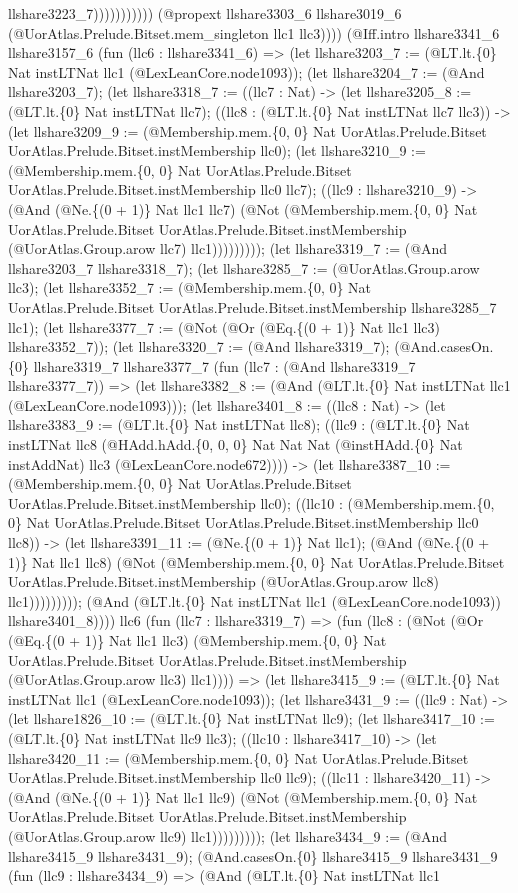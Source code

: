 \documentclass[11pt]{article}
\begin{document}
llshare3223\_7))))))))))) (@propext llshare3303\_6 llshare3019\_6 (@UorAtlas.Prelude.Bitset.mem\_singleton llc1 llc3)))) (@Iff.intro llshare3341\_6 llshare3157\_6 (fun (llc6 : llshare3341\_6) => (let llshare3203\_7 := (@LT.lt.\{0\} Nat instLTNat llc1 (@LexLeanCore.node1093)); (let llshare3204\_7 := (@And llshare3203\_7); (let llshare3318\_7 := ((llc7 : Nat) -> (let llshare3205\_8 := (@LT.lt.\{0\} Nat instLTNat llc7); ((llc8 : (@LT.lt.\{0\} Nat instLTNat llc7 llc3)) -> (let llshare3209\_9 := (@Membership.mem.\{0, 0\} Nat UorAtlas.Prelude.Bitset UorAtlas.Prelude.Bitset.instMembership llc0); (let llshare3210\_9 := (@Membership.mem.\{0, 0\} Nat UorAtlas.Prelude.Bitset UorAtlas.Prelude.Bitset.instMembership llc0 llc7); ((llc9 : llshare3210\_9) -> (@And (@Ne.\{(0 + 1)\} Nat llc1 llc7) (@Not (@Membership.mem.\{0, 0\} Nat UorAtlas.Prelude.Bitset UorAtlas.Prelude.Bitset.instMembership (@UorAtlas.Group.arow llc7) llc1))))))))); (let llshare3319\_7 := (@And llshare3203\_7 llshare3318\_7); (let llshare3285\_7 := (@UorAtlas.Group.arow llc3); (let llshare3352\_7 := (@Membership.mem.\{0, 0\} Nat UorAtlas.Prelude.Bitset UorAtlas.Prelude.Bitset.instMembership llshare3285\_7 llc1); (let llshare3377\_7 := (@Not (@Or (@Eq.\{(0 + 1)\} Nat llc1 llc3) llshare3352\_7)); (let llshare3320\_7 := (@And llshare3319\_7); (@And.casesOn.\{0\} llshare3319\_7 llshare3377\_7 (fun (llc7 : (@And llshare3319\_7 llshare3377\_7)) => (let llshare3382\_8 := (@And (@LT.lt.\{0\} Nat instLTNat llc1 (@LexLeanCore.node1093))); (let llshare3401\_8 := ((llc8 : Nat) -> (let llshare3383\_9 := (@LT.lt.\{0\} Nat instLTNat llc8); ((llc9 : (@LT.lt.\{0\} Nat instLTNat llc8 (@HAdd.hAdd.\{0, 0, 0\} Nat Nat Nat (@instHAdd.\{0\} Nat instAddNat) llc3 (@LexLeanCore.node672)))) -> (let llshare3387\_10 := (@Membership.mem.\{0, 0\} Nat UorAtlas.Prelude.Bitset UorAtlas.Prelude.Bitset.instMembership llc0); ((llc10 : (@Membership.mem.\{0, 0\} Nat UorAtlas.Prelude.Bitset UorAtlas.Prelude.Bitset.instMembership llc0 llc8)) -> (let llshare3391\_11 := (@Ne.\{(0 + 1)\} Nat llc1); (@And (@Ne.\{(0 + 1)\} Nat llc1 llc8) (@Not (@Membership.mem.\{0, 0\} Nat UorAtlas.Prelude.Bitset UorAtlas.Prelude.Bitset.instMembership (@UorAtlas.Group.arow llc8) llc1))))))))); (@And (@LT.lt.\{0\} Nat instLTNat llc1 (@LexLeanCore.node1093)) llshare3401\_8)))) llc6 (fun (llc7 : llshare3319\_7) => (fun (llc8 : (@Not (@Or (@Eq.\{(0 + 1)\} Nat llc1 llc3) (@Membership.mem.\{0, 0\} Nat UorAtlas.Prelude.Bitset UorAtlas.Prelude.Bitset.instMembership (@UorAtlas.Group.arow llc3) llc1)))) => (let llshare3415\_9 := (@LT.lt.\{0\} Nat instLTNat llc1 (@LexLeanCore.node1093)); (let llshare3431\_9 := ((llc9 : Nat) -> (let llshare1826\_10 := (@LT.lt.\{0\} Nat instLTNat llc9); (let llshare3417\_10 := (@LT.lt.\{0\} Nat instLTNat llc9 llc3); ((llc10 : llshare3417\_10) -> (let llshare3420\_11 := (@Membership.mem.\{0, 0\} Nat UorAtlas.Prelude.Bitset UorAtlas.Prelude.Bitset.instMembership llc0 llc9); ((llc11 : llshare3420\_11) -> (@And (@Ne.\{(0 + 1)\} Nat llc1 llc9) (@Not (@Membership.mem.\{0, 0\} Nat UorAtlas.Prelude.Bitset UorAtlas.Prelude.Bitset.instMembership (@UorAtlas.Group.arow llc9) llc1))))))))); (let llshare3434\_9 := (@And llshare3415\_9 llshare3431\_9); (@And.casesOn.\{0\} llshare3415\_9 llshare3431\_9 (fun (llc9 : llshare3434\_9) => (@And (@LT.lt.\{0\} Nat instLTNat llc1 
\end{document}
